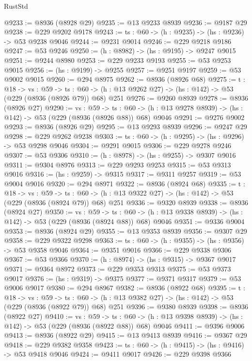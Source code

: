 \begin{lexlean}{RustStd}
\begin{coremodule}
@9233 := @8936 (@8928 @29)
@9235 := @13 @9233 @8939
@9236 := @9187 @29
@9238 := @229 @9202 @9178
@9243 := {ts : @60} -> (h : @9235) -> (hs : @9236) -> @53 @9238 @9046
@9244 := @9231 @9014
@9246 := @229 @9218 @9186
@9247 := @53 @9246
@9250 := (h : @8982) -> (hs : @9195) -> @9247 @9015
@9251 := @9244 @8980
@9253 := @229 @9233 @9193
@9255 := @53 @9253 @9015
@9256 := (hs : @9199) -> @9255
@9257 := @9251 @9197
@9259 := @53 @9002 @9015
@9260 := @294 @8975
@9262 := @8936 (@8926 @68)
@9275 := {t : @18} ->
  {vs : @59} ->
  {ts : @60} -> (h : @13 @9262 @27) -> (hs : @142) -> @53 (@229 (@8936 (@8926 @79)) @68) @251
@9276 := @9260 @8939
@9278 := @8936 (@8926 @27)
@9290 := {vs : @59} ->
  {ts : @60} -> (h : @13 @9278 @8939) -> (hs : @142) -> @53 (@229 (@8936 (@8926 @88)) @68) @9046
@9291 := @9276 @9002
@9293 := @8936 (@8926 @29)
@9295 := @13 @9293 @8939
@9296 := @9247 @29
@9298 := @229 @9262 @9238
@9303 := {ts : @60} -> (h : @9295) -> (hs : @9296) -> @53 @9298 @9046
@9304 := @9291 @9015
@9306 := @229 @9278 @9246
@9307 := @53 @9306
@9310 := (h : @8978) -> (hs : @9255) -> @9307 @9016
@9311 := @9304 @8976
@9313 := @229 @9293 @9253
@9315 := @53 @9313 @9016
@9316 := (hs : @9259) -> @9315
@9317 := @9311 @9257
@9319 := @53 @9004 @9016
@9320 := @294 @8971
@9322 := @8936 (@8924 @68)
@9335 := {t : @18} ->
  {vs : @59} ->
  {ts : @60} -> (h : @13 @9322 @27) -> (hs : @142) -> @53 (@229 (@8936 (@8924 @79)) @68) @251
@9336 := @9320 @8939
@9338 := @8936 (@8924 @27)
@9350 := {vs : @59} ->
  {ts : @60} -> (h : @13 @9338 @8939) -> (hs : @142) -> @53 (@229 (@8936 (@8924 @88)) @68) @9046
@9351 := @9336 @9004
@9353 := @8936 (@8924 @29)
@9355 := @13 @9353 @8939
@9356 := @9307 @29
@9358 := @229 @9322 @9298
@9363 := {ts : @60} -> (h : @9355) -> (hs : @9356) -> @53 @9358 @9046
@9364 := @9351 @9016
@9366 := @229 @9338 @9306
@9367 := @53 @9366
@9370 := (h : @8974) -> (hs : @9315) -> @9367 @9017
@9371 := @9364 @8972
@9373 := @229 @9353 @9313
@9375 := @53 @9373 @9017
@9376 := (hs : @9319) -> @9375
@9377 := @9371 @9317
@9379 := @53 @9006 @9017
@9380 := @294 @8967
@9382 := @8936 (@8922 @68)
@9395 := {t : @18} ->
  {vs : @59} ->
  {ts : @60} -> (h : @13 @9382 @27) -> (hs : @142) -> @53 (@229 (@8936 (@8922 @79)) @68) @251
@9396 := @9380 @8939
@9398 := @8936 (@8922 @27)
@9410 := {vs : @59} ->
  {ts : @60} -> (h : @13 @9398 @8939) -> (hs : @142) -> @53 (@229 (@8936 (@8922 @88)) @68) @9046
@9411 := @9396 @9006
@9413 := @8936 (@8922 @29)
@9415 := @13 @9413 @8939
@9416 := @9367 @29
@9418 := @229 @9382 @9358
@9423 := {ts : @60} -> (h : @9415) -> (hs : @9416) -> @53 @9418 @9046
@9424 := @9411 @9017
@9426 := @229 @9398 @9366

\end{coremodule}
\end{lexlean}
